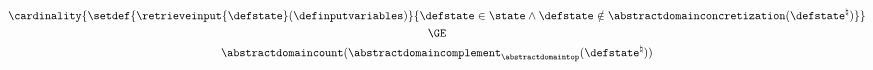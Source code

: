 \begin{gather*}
\cardinality{\setdef{\retrieveinput{\defstate}(\definputvariables)}{\defstate\in\state \land \defstate \notin \abstractdomainconcretization(\defstate^\natural)}} \\
\GE
\\
\abstractdomaincount(\abstractdomaincomplement_\abstractdomaintop(\defstate^\natural))
\end{gather*}
